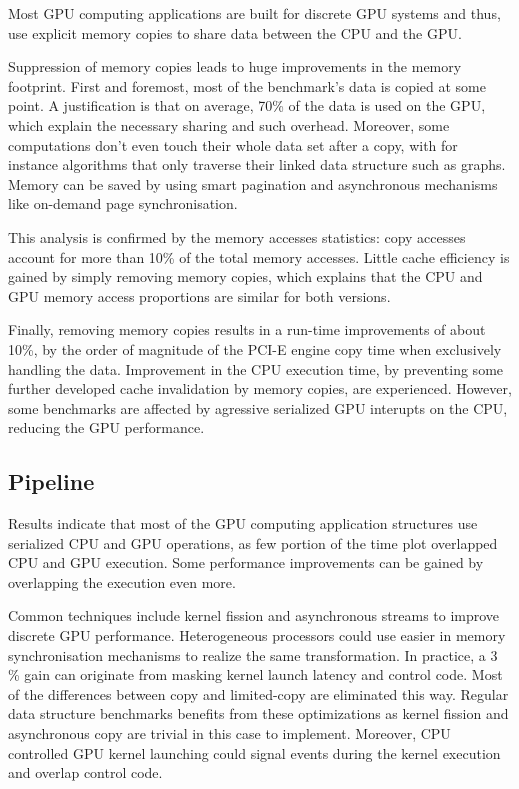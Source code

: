 \documentclass[11pt,twoside,a4paper]{article}
\begin{document}
\begin{multicols}{2}
Most GPU computing applications are built for discrete GPU systems and thus, use
explicit memory copies to share data between the CPU and the GPU\@.

Suppression of memory copies leads to huge improvements in the memory
footprint. First and foremost, most of the benchmark's data is copied at some
point. A justification is that on average, 70\% of the data is used on the GPU,
which explain the necessary sharing and such overhead. Moreover, some
computations don't even touch their whole data set after a copy, with for
instance algorithms that only traverse their linked data structure such as
graphs. Memory can be saved by using smart pagination and asynchronous
mechanisms like on-demand page synchronisation.

This analysis is confirmed by the memory accesses statistics: copy accesses
account for more than 10\% of the total memory accesses. Little cache
efficiency is gained by simply removing memory copies, which explains that the
CPU and GPU memory access proportions are similar for both versions.

Finally, removing memory copies results in a run-time improvements of about
10\%, by the order of magnitude of the PCI-E engine copy time when exclusively
handling the data. Improvement in the CPU execution time, by preventing some
further developed cache invalidation by memory copies, are experienced.
However, some benchmarks are affected by agressive serialized
GPU interupts on the CPU, reducing the GPU performance.

\subsection{Pipeline}

Results indicate that most of the GPU computing application structures use
serialized CPU and GPU operations, as few portion of the time plot overlapped
CPU and GPU execution. Some performance improvements can be gained by
overlapping the execution even more.

Common techniques include kernel fission and asynchronous streams to improve
discrete GPU performance. Heterogeneous processors could use easier in memory
synchronisation mechanisms to realize the same transformation. In practice, a 3
\% gain can originate from masking kernel launch latency and control code. Most
of the differences between copy and limited-copy are eliminated this way.
Regular data structure benchmarks benefits from these optimizations as kernel
fission and asynchronous copy are trivial in this case to implement. Moreover,
CPU controlled GPU kernel launching could signal events during the kernel
execution and overlap control code.


\end{multicols}
\end{document}
